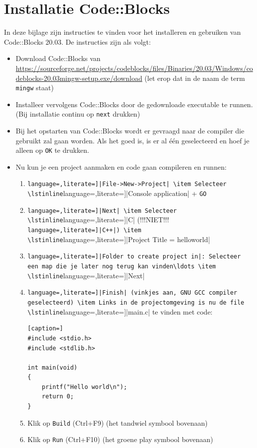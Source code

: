 \documentclass[a4paper,10pt,fleqn,twoside]{article}
\begin{document}
\clearpage
\section{Installatie Code::Blocks}
\label{sec:installcodeblocks}

In deze bijlage zijn instructies te vinden voor het installeren en gebruiken van Code::Blocks 20.03. De instructies zijn als volgt:

\begin{itemize}
\item Download Code::Blocks van \url{https://sourceforge.net/projects/codeblocks/files/Binaries/20.03/Windows/codeblocks-20.03mingw-setup.exe/download} (let erop dat in de naam de term \texttt{mingw} staat)
\item Installeer vervolgens Code::Blocks door de gedownloade executable te runnen. (Bij installatie continu op \texttt{next} drukken)
\item Bij het opstarten van Code::Blocks wordt er gevraagd naar de compiler die gebruikt zal gaan worden. Als het goed is, is er al \'e\'en geselecteerd en hoef je alleen op \texttt{OK} te drukken.
\item Nu kun je een project aanmaken en code gaan compileren en runnen:
\begin{enumerate}[label=\alph*.]
\item \lstinline[language=,literate=]|File->New->Project|
\item Selecteer \lstinline[language=,literate=]|Console application| + \lstinline|GO|
\item \lstinline[language=,literate=]|Next|
\item Selecteer \lstinline[language=,literate=]|C| (!!!NIET!!! \lstinline[language=,literate=]|C++|)
\item \lstinline[language=,literate=]|Project Title = helloworld|
\item \lstinline[language=,literate=]|Folder to create project in|: Selecteer een map die je later nog terug kan vinden\ldots
\item \lstinline[language=,literate=]|Next|
\item \lstinline[language=,literate=]|Finish| (vinkjes aan, GNU GCC compiler geselecteerd)
\item Links in de projectomgeving is nu de file \lstinline[language=,literate=]|main.c| te vinden met code:

\begin{lstlisting}[caption=]
#include <stdio.h>
#include <stdlib.h>

int main(void)
{
    printf("Hello world\n");
    return 0;
}
\end{lstlisting}
\item Klik op \lstinline|Build| (Ctrl+F9) (het tandwiel symbool bovenaan)
\item Klik op \lstinline|Run| (Ctrl+F10) (het groene play symbool bovenaan)
\end{enumerate}
\end{itemize}
\end{document}
